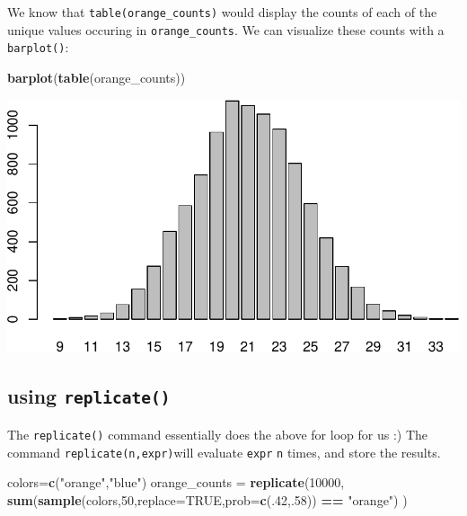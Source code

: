 \documentclass[
]{book}
\newenvironment{Shaded}{\begin{snugshade}}{\end{snugshade}}
\newcommand{\AttributeTok}[1]{\textcolor[rgb]{0.13,0.29,0.53}{#1}}
\newcommand{\ConstantTok}[1]{\textcolor[rgb]{0.56,0.35,0.01}{#1}}
\newcommand{\DecValTok}[1]{\textcolor[rgb]{0.00,0.00,0.81}{#1}}
\newcommand{\FunctionTok}[1]{\textcolor[rgb]{0.13,0.29,0.53}{\textbf{#1}}}
\newcommand{\NormalTok}[1]{#1}
\newcommand{\OtherTok}[1]{\textcolor[rgb]{0.56,0.35,0.01}{#1}}
\newcommand{\SpecialCharTok}[1]{\textcolor[rgb]{0.81,0.36,0.00}{\textbf{#1}}}
\newcommand{\StringTok}[1]{\textcolor[rgb]{0.31,0.60,0.02}{#1}}
\theoremstyle{definition}
\theoremstyle{definition}
\theoremstyle{definition}
\theoremstyle{definition}
\theoremstyle{remark}
\begin{document}
We know that \texttt{table(orange\_counts)} would display the counts of each of the unique values occuring in \texttt{orange\_counts}. We can visualize these counts with a \texttt{barplot()}:

\begin{Shaded}
\begin{Highlighting}[]
\FunctionTok{barplot}\NormalTok{(}\FunctionTok{table}\NormalTok{(orange\_counts))}
\end{Highlighting}
\end{Shaded}

\includegraphics{math340-notes_files/figure-latex/unnamed-chunk-89-1.pdf}

\subsection*{\texorpdfstring{using \texttt{replicate()}}{using replicate()}}\label{using-replicate}

The \texttt{replicate()} command essentially does the above for loop for us :) The command \texttt{replicate(n,expr)}will evaluate \texttt{expr} \texttt{n} times, and store the results.

\begin{Shaded}
\begin{Highlighting}[]
\NormalTok{colors}\OtherTok{=}\FunctionTok{c}\NormalTok{(}\StringTok{"orange"}\NormalTok{,}\StringTok{"blue"}\NormalTok{)}
\NormalTok{orange\_counts }\OtherTok{=} 
  \FunctionTok{replicate}\NormalTok{(}\DecValTok{10000}\NormalTok{,}
            \FunctionTok{sum}\NormalTok{(}\FunctionTok{sample}\NormalTok{(colors,}\DecValTok{50}\NormalTok{,}\AttributeTok{replace=}\ConstantTok{TRUE}\NormalTok{,}\AttributeTok{prob=}\FunctionTok{c}\NormalTok{(.}\DecValTok{42}\NormalTok{,.}\DecValTok{58}\NormalTok{)) }\SpecialCharTok{==} \StringTok{"orange"}\NormalTok{)}
\NormalTok{            )}
\end{Highlighting}
\end{Shaded}
\end{document}
